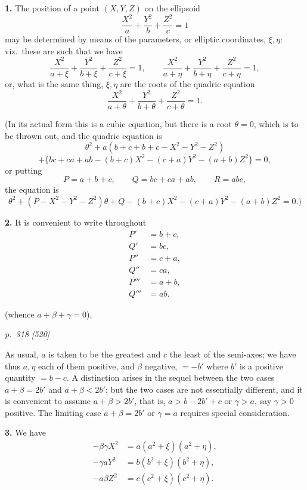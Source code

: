 \documentclass[11pt,a4paper]{book}
\begin{document}
\textbf{1.} The position of a point $(X, Y, Z)$ on the ellipsoid
\[
\frac{X^2}{a} + \frac{Y^2}{b} + \frac{Z^2}{c} = 1
\]
may be determined by means of the parameters, or elliptic coordinates, $\xi, \eta$: viz.\ these are such that we have
\[
\frac{X^2}{a + \xi} + \frac{Y^2}{b + \xi} + \frac{Z^2}{c + \xi} = 1,\qquad
\frac{X^2}{a + \eta} + \frac{Y^2}{b + \eta} + \frac{Z^2}{c + \eta} = 1,
\]
or, what is the same thing, $\xi, \eta$ are the roots of the quadric equation
\[
\frac{X^2}{a + \theta} + \frac{Y^2}{b + \theta} + \frac{Z^2}{c + \theta} = 1.
\]

(In its actual form this is a cubic equation, but there is a root $\theta = 0$, which is to be thrown out, and the quadric equation is
\[
\theta^2 + a(b + c + b + c - X^2 - Y^2 - Z^2)
\]
\[
+ \{bc + ca + ab - (b + c)X^2 - (c + a)Y^2 - (a + b)Z^2\} = 0,
\]
or putting
\[
P = a + b + c,\qquad Q = bc + ca + ab,\qquad R = abc,
\]
the equation is
\[
\theta^2 + (P - X^2 - Y^2 - Z^2)\theta + Q - (b + c)X^2 - (c + a)Y^2 - (a + b)Z^2 = 0.)
\]

\textbf{2.} It is convenient to write throughout
\begin{align*}
P' &= b + c,\\
Q' &= bc,\\
P'' &= c + a,\\
Q'' &= ca,\\
P''' &= a + b,\\
Q''' &= ab.
\end{align*}

(whence $a + \beta + \gamma = 0$),

\clearpage

\bigskip
\textit{p.~318 [520]}
\smallskip

As usual, $a$ is taken to be the greatest and $c$ the least of the semi-axes; we have thus $a, \eta$ each of them positive, and $\beta$ negative, $=-b'$ where $b'$ is a positive quantity $=b - c$. A distinction arises in the sequel between the two cases $a + \beta = 2b'$ and $a + \beta < 2b'$; but the two cases are not essentially different, and it is convenient to assume $a + \beta > 2b'$, that is, $a > b - 2b' + c$ or $\gamma > a$, say $\gamma > 0$ positive. The limiting case $a + \beta = 2b'$ or $\gamma = a$ requires special consideration.

\textbf{3.} We have
\begin{align*}
-\beta\gamma X^2 &= a(a^2 + \xi)(a^2 + \eta),\\
-\gamma a Y^2 &= b(b^2 + \xi)(b^2 + \eta),\\
-a\beta Z^2 &= c(c^2 + \xi)(c^2 + \eta).
\end{align*}
\end{document}
